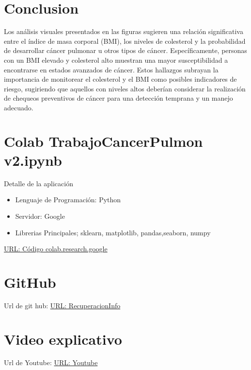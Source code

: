 \documentclass[10pt,journal,compsoc]{IEEEtran}
\begin{document}
\section{Conclusion}
Los análisis visuales presentados en las figuras sugieren una relación significativa entre el índice de masa corporal (BMI), los niveles de colesterol y la probabilidad de desarrollar cáncer pulmonar u otros tipos de cáncer. Específicamente, personas con un BMI elevado y colesterol alto muestran una mayor susceptibilidad a encontrarse en estados avanzados de cáncer. Estos hallazgos subrayan la importancia de monitorear el colesterol y el BMI como posibles indicadores de riesgo, sugiriendo que aquellos con niveles altos deberían considerar la realización de chequeos preventivos de cáncer para una detección temprana y un manejo adecuado.



\appendices
\section{Colab TrabajoCancerPulmon v2.ipynb}
Detalle de la aplicación
\begin{itemize}
  \item Lenguaje de Programación: Python
  \item Servidor: Google
  \item Librerias Principales; sklearn, matplotlib, pandas,seaborn, numpy
\end{itemize}
\href{https://colab.research.google.com/drive/1-HcDMOWJxGsakeZxqYCUc18EXPyz__4q?usp=sharing}{URL: Código  colab.research.google }

\section{GitHub}
Url de git hub:
\href{https://github.com/hAriasm/RecuperacionInfo}{URL: RecuperacionInfo }

 \section{Video explicativo}
Url de Youtube:
\href{https://github.com/hAriasm/RecuperacionInfo}{URL: Youtube }



\ifCLASSOPTIONcaptionsoff
  \newpage
\fi
\end{document}

